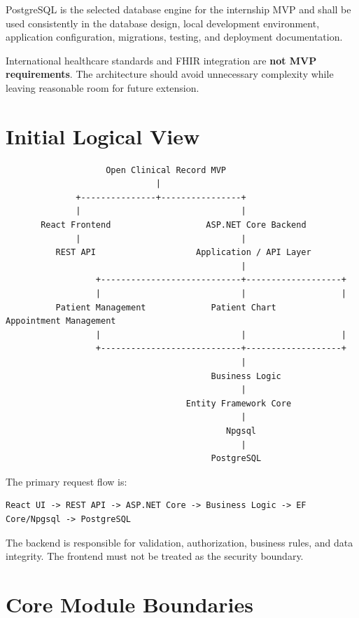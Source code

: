 \documentclass[11pt,a4paper]{article}
\begin{document}
PostgreSQL is the selected database engine for the internship MVP and shall be used consistently in the database design, local development environment, application configuration, migrations, testing, and deployment documentation.

International healthcare standards and FHIR integration are \textbf{not MVP requirements}. The architecture should avoid unnecessary complexity while leaving reasonable room for future extension.

\section{Initial Logical View}
\begin{verbatim}
                    Open Clinical Record MVP
                              |
              +---------------+----------------+
              |                                |
       React Frontend                   ASP.NET Core Backend
              |                                |
          REST API                    Application / API Layer
                                               |
                  +----------------------------+-------------------+
                  |                            |                   |
          Patient Management             Patient Chart      Appointment Management
                  |                            |                   |
                  +----------------------------+-------------------+
                                               |
                                         Business Logic
                                               |
                                    Entity Framework Core
                                               |
                                            Npgsql
                                               |
                                         PostgreSQL
\end{verbatim}

The primary request flow is:
\begin{verbatim}
React UI -> REST API -> ASP.NET Core -> Business Logic -> EF Core/Npgsql -> PostgreSQL
\end{verbatim}

The backend is responsible for validation, authorization, business rules, and data integrity. The frontend must not be treated as the security boundary.

\section{Core Module Boundaries}
\end{document}
